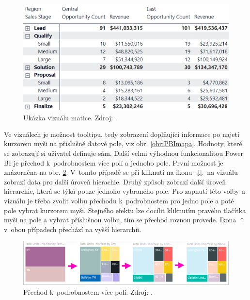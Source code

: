 \begin{figure}[hbtp!]
\begin{minipage}{.4\textwidth}
        \includegraphics[width=\textwidth]{obrazky/PBIteorie/power-bi-expansion-state.png}
        \caption{Ukázka vizuálu matice. Zdroj: \cite{bib:PBI}.}
        \label{obr:PBItab.}
    \end{minipage}
\end{figure}

Ve vizuálech je možnost tooltipu, tedy zobrazení doplňující informace po najetí kurzorem myši na příslušné datové pole, viz obr. \ref*{obr:PBImapa}. Hodnoty, které se zobrazují si uživatel definuje sám. Další velmi výhodnou funkcionalitou Power BI je přechod k~podrobnostem více polí a jednoho pole. První možnost je znázorněna na obr.     \ref*{obr:PBIdrillall}. V~tomto případě se při kliknutí na ikonu $\downdownarrows$ na vizuálu zobrazí data pro další úroveň hierachie. Druhý způsob zobrazí další úroveň hierarchie, která se týká pouze jednoho vybraného pole. Pro zapnutí této volby u vizuálu je třeba zvolit volbu přechodu k~podrobnostem pro jedno pole a poté pole vybrat kurzorem myši. Stejného efektu lze docílit kliknutím pravého tlačítka myši na pole a vybrat příslušnou volbu, tím se přechod rovnou provede. Ikona $\uparrow$ v~obou případech přechází na vyšší hierarchii.

\begin{figure}[h!]
    \centering
    \captionsetup{justification=centering}
    \includegraphics[width=.9\textwidth]{obrazky/PBIteorie/power-bi-drill-path.png}
    \caption{Přechod k~podrobnostem více polí. 
    Zdroj: \cite{bib:PBI}.}
    \label{obr:PBIdrillall}
\end{figure}

